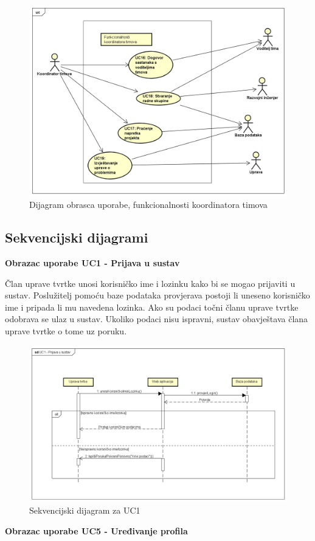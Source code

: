 					\begin{figure} 
						\includegraphics[width=\textwidth]{slike/funkc_koordinatora.png}
						\caption{Dijagram obrasca uporabe, funkcionalnosti koordinatora timova}
					\end{figure}
				\eject		
				
			\subsection{Sekvencijski dijagrami}
				
				\textbf{Obrazac uporabe UC1 - Prijava u sustav}

				\par Član uprave tvrtke unosi korisničko ime i lozinku kako bi se mogao prijaviti u sustav. Poslužitelj pomoću baze podataka provjerava postoji li uneseno korisničko ime i pripada li mu navedena lozinka. Ako su podaci točni članu uprave tvrtke odobrava se ulaz u sustav. Ukoliko podaci nisu ispravni, sustav obavještava člana uprave tvrtke o tome uz poruku. 
				\begin{figure}[h!]
				\includegraphics[width=\textwidth]{slike/Sekvencijski_UC1.png}
				\caption{Sekvencijski dijagram za UC1}
				\end{figure}
				\newpage
				\textbf{Obrazac uporabe UC5 - Uređivanje profila}
				
